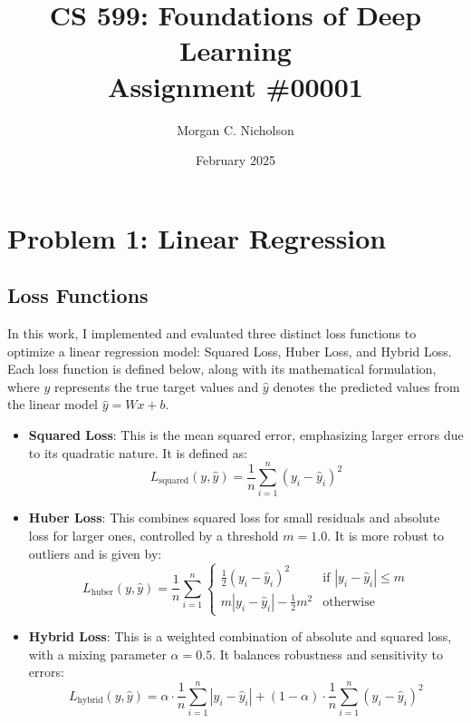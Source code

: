 \documentclass{article}
\title{CS 599: Foundations of Deep Learning\\Assignment \#00001}
\author{Morgan C. Nicholson}
\date{February 2025}
\begin{document}
\maketitle

\section{Problem 1: Linear Regression}
\subsection{Loss Functions}

In this work, I implemented and evaluated three distinct loss functions to optimize a linear regression model: Squared Loss, Huber Loss, and Hybrid Loss. Each loss function is defined below, along with its mathematical formulation, where \( y \) represents the true target values and \( \hat{y} \) denotes the predicted values from the linear model \( \hat{y} = Wx + b \).

\begin{itemize}
    \item \textbf{Squared Loss}: This is the mean squared error, emphasizing larger errors due to its quadratic nature. It is defined as:
    \begin{equation}
        L_{\text{squared}}(y, \hat{y}) = \frac{1}{n} \sum_{i=1}^{n} (y_i - \hat{y}_i)^2
    \end{equation}
    
    \item \textbf{Huber Loss}: This combines squared loss for small residuals and absolute loss for larger ones, controlled by a threshold \( m = 1.0 \). It is more robust to outliers and is given by:
    \begin{equation}
        L_{\text{huber}}(y, \hat{y}) = \frac{1}{n} \sum_{i=1}^{n} 
        \begin{cases} 
            \frac{1}{2} (y_i - \hat{y}_i)^2 & \text{if } |y_i - \hat{y}_i| \leq m \\
            m |y_i - \hat{y}_i| - \frac{1}{2} m^2 & \text{otherwise}
        \end{cases}
    \end{equation}
    
    \item \textbf{Hybrid Loss}: This is a weighted combination of absolute and squared loss, with a mixing parameter \( \alpha = 0.5 \). It balances robustness and sensitivity to errors:
    \begin{equation}
        L_{\text{hybrid}}(y, \hat{y}) = \alpha \cdot \frac{1}{n} \sum_{i=1}^{n} |y_i - \hat{y}_i| + (1 - \alpha) \cdot \frac{1}{n} \sum_{i=1}^{n} (y_i - \hat{y}_i)^2
    \end{equation}
\end{itemize}
\end{document}
